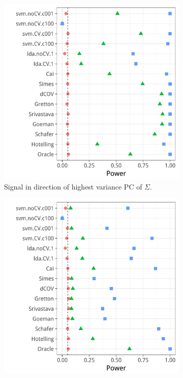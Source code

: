 \documentclass[journal]{IEEEtran}
\begin{document}
\begin{figure}[h]
	\centering
	\caption{Short memory, AR(1) correlation. 
		$\Sigma_{k,l}=\rho^{|k-l|}; \rho=0.6$}	
	\label{fig:dependence_1}
	\begin{subfigure}[t]{.45\columnwidth}
		\centering
		\includegraphics[width=1\columnwidth]{"art/file20"}
		\caption{Signal in direction of highest variance PC of $\Sigma$.} 
		\label{fig:dependence_11}
	\end{subfigure}
	\begin{subfigure}[t]{.45\columnwidth}
		\centering
		\includegraphics[width=1\columnwidth]{"art/file21"}

\end{subfigure}
\end{figure}
\end{document}
